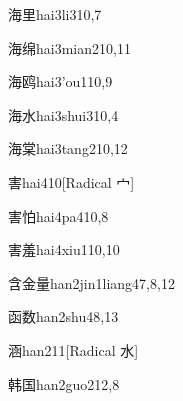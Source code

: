\begin{verbete}{海里}{hai3li3}{10,7}
\end{verbete}

\begin{verbete}{海绵}{hai3mian2}{10,11}
\end{verbete}

\begin{verbete}{海鸥}{hai3'ou1}{10,9}
\end{verbete}

\begin{verbete}{海水}{hai3shui3}{10,4}
\end{verbete}

\begin{verbete}{海棠}{hai3tang2}{10,12}
\end{verbete}

\begin{verbete}{害}{hai4}{10}[Radical 宀]
\end{verbete}

\begin{verbete}{害怕}{hai4pa4}{10,8}
\end{verbete}

\begin{verbete}{害羞}{hai4xiu1}{10,10}
\end{verbete}

\begin{verbete}{含金量}{han2jin1liang4}{7,8,12}
\end{verbete}

\begin{verbete}{函数}{han2shu4}{8,13}
\end{verbete}

\begin{verbete}{涵}{han2}{11}[Radical 水]
\end{verbete}

\begin{verbete}{韩国}{han2guo2}{12,8}
\end{verbete}

